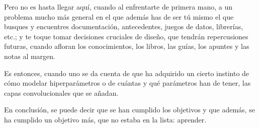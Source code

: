 Pero no es hasta llegar aquí, cuando al enfrentarte de primera mano, a un problema mucho más general en el que además has de ser tú mismo el que busques y encuentres documentación, antecedentes, juegos de datos, librerías, etc.; y te toque tomar decisiones cruciales de diseño, que tendrán repercusiones futuras, cuando afloran los conocimientos, los libros, las guías, los apuntes y las notas al margen.

Es entonces, cuando uno se da cuenta de que ha adquirido un cierto instinto de cómo modelar hiperparámetros o de cuántas y qué parámetros han de tener, las capas convolucionales que se añadan.

En conclusión, se puede decir que se han cumplido los objetivos y que además, se ha cumplido un objetivo más, que no estaba en la lista: aprender.

